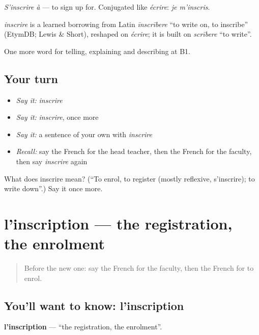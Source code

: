 \emph{S'inscrire à} — to sign up for. Conjugated like \emph{écrire}: \emph{je m'inscris}.

\begin{cousinweb}
\emph{inscrire} is a learned borrowing from Latin \emph{īnscrībere} \textquotedblleft{}to write on, to inscribe\textquotedblright{} (EtymDB; Lewis \& Short), reshaped on \emph{écrire}; it is built on \emph{scrībere} \textquotedblleft{}to write\textquotedblright{}.
\end{cousinweb}

\begin{grammarlens}[title={What you've built}]
One more word for telling, explaining and describing at B1.
\end{grammarlens}

\subsection*{Your turn}
\begin{itemize}
\raggedright
  \item \emph{Say it:} \emph{inscrire}
  \item \emph{Say it:} \emph{inscrire}, once more
  \item \emph{Say it:} a sentence of your own with \emph{inscrire}
  \item \emph{Recall:} say the French for the head teacher, then the French for the faculty, then say \emph{inscrire} again
\end{itemize}

\begin{tcolorbox}[breakable,colback=teal!4,colframe=teal!35!black,title={Before you move on}]
What does inscrire mean? (\textquotedblleft{}To enrol, to register (mostly reflexive, s'inscrire); to write down\textquotedblright{}.) Say it once more.
\end{tcolorbox}
\section[l'inscription]{l'inscription — the registration, the enrolment}

\label{lesson:FR-C376-inscription}



\begin{quote}
Before the new one: say the French for the faculty, then the French for to enrol.
\end{quote}

\subsection*{You'll want to know: l'inscription}
\textbf{l'inscription} — \textquotedblleft{}the registration, the enrolment\textquotedblright{}.

